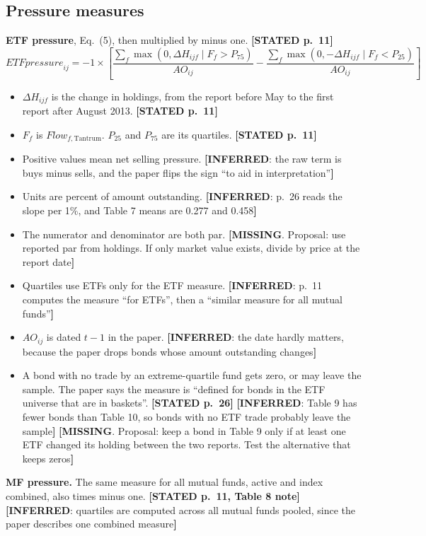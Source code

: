 \documentclass[10pt,a4paper]{article}
\newcommand{\ST}[1]{\textcolor{cst}{\textbf{[STATED #1]}}}
\newcommand{\IN}[1]{\textcolor{cin}{\textbf{[INFERRED}: #1\textbf{]}}}
\newcommand{\MI}[1]{\textcolor{cmi}{\textbf{[MISSING}. Proposal: #1\textbf{]}}}
\begin{document}
\subsection{Pressure measures}
\textbf{ETF pressure}, Eq.~(5), then multiplied by minus one. \ST{p.~11}
\begin{equation}\label{eq:pressure}
\mathit{ETFpressure}_{ij}=-1\times\left[\frac{\sum_{f}\max(0,\Delta H_{ijf}\mid F_f>P_{75})}{AO_{ij}}-\frac{\sum_{f}\max(0,-\Delta H_{ijf}\mid F_f<P_{25})}{AO_{ij}}\right]
\end{equation}
\begin{itemize}
\item $\Delta H_{ijf}$ is the change in holdings, from the report before May to the first report after August 2013. \ST{p.~11}
\item $F_f$ is $\mathit{Flow}_{f,\text{Tantrum}}$. $P_{25}$ and $P_{75}$ are its quartiles. \ST{p.~11}
\item Positive values mean net selling pressure. \IN{the raw term is buys minus sells, and the paper flips the sign ``to aid in interpretation''}
\item Units are percent of amount outstanding. \IN{p.~26 reads the slope per 1\%, and Table 7 means are 0.277 and 0.458}
\item The numerator and denominator are both par. \MI{use reported par from holdings. If only market value exists, divide by price at the report date}
\item Quartiles use ETFs only for the ETF measure. \IN{p.~11 computes the measure ``for ETFs'', then a ``similar measure for all mutual funds''}
\item $AO_{ij}$ is dated $t-1$ in the paper. \IN{the date hardly matters, because the paper drops bonds whose amount outstanding changes}
\item A bond with no trade by an extreme-quartile fund gets zero, or may leave the sample. The paper says the measure is ``defined for bonds in the ETF universe that are in baskets''. \ST{p.~26} \IN{Table 9 has fewer bonds than Table 10, so bonds with no ETF trade probably leave the sample} \MI{keep a bond in Table 9 only if at least one ETF changed its holding between the two reports. Test the alternative that keeps zeros}
\end{itemize}

\textbf{MF pressure.} The same measure for all mutual funds, active and index combined, also times minus one. \ST{p.~11, Table 8 note} \IN{quartiles are computed across all mutual funds pooled, since the paper describes one combined measure}
\end{document}
